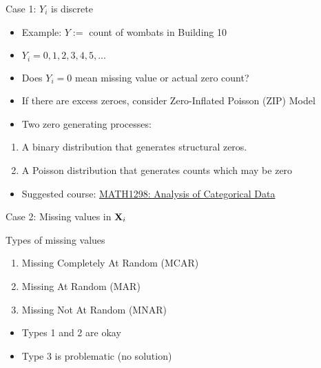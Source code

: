 \documentclass[ignorenonframetext,]{beamer}
\providecommand{\tightlist}{%
  \setlength{\itemsep}{0pt}\setlength{\parskip}{0pt}}
\begin{document}
\begin{frame}{Case 1: \(Y_{i}\) is discrete}

\begin{itemize}[<+->]
\tightlist
\item
  Example: \(Y:=\) count of wombats in Building 10
\item
  \(Y_{i}=0, 1, 2, 3, 4, 5, ...\)
\item
  Does \(Y_{i}=0\) mean missing value or actual zero count?
\item
  If there are excess zeroes, consider Zero-Inflated Poisson (ZIP) Model
\item
  Two zero generating processes:
\end{itemize}

\begin{enumerate}[<+->]
\def\labelenumi{\arabic{enumi}.}
\tightlist
\item
  A binary distribution that generates structural zeros.
\item
  A Poisson distribution that generates counts which may be zero
\end{enumerate}

\begin{itemize}[<+->]
\tightlist
\item
  Suggested course:
  \href{http://www1.rmit.edu.au/courses/011998}{MATH1298: Analysis of
  Categorical Data}
\end{itemize}

\end{frame}

\begin{frame}{Case 2: Missing values in \(\bold{X}_{i}\)}

Types of missing values

\begin{enumerate}[<+->]
\def\labelenumi{\arabic{enumi}.}
\tightlist
\item
  Missing Completely At Random (MCAR)
\item
  Missing At Random (MAR)
\item
  \color{red}Missing Not At Random (MNAR) \color{black}
\end{enumerate}

\begin{itemize}[<+->]
\tightlist
\item
  Types 1 and 2 are okay
\item
  Type 3 is problematic (no solution)
\end{itemize}

\end{frame}
\end{document}
